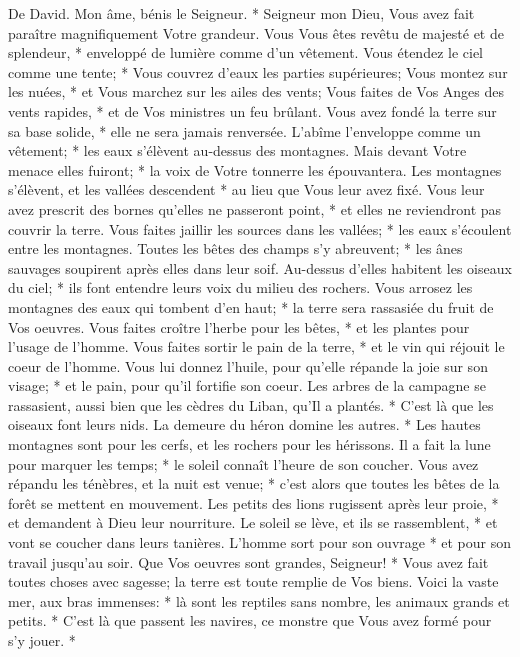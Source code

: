 De David. Mon âme, bénis le Seigneur. * Seigneur mon Dieu, Vous avez fait paraître magnifiquement Votre grandeur. Vous Vous êtes revêtu de majesté et de splendeur, *
enveloppé de lumière comme d'un vêtement. Vous étendez le ciel comme une tente; *
Vous couvrez d'eaux les parties supérieures; Vous montez sur les nuées, * et Vous marchez sur les ailes des vents;
Vous faites de Vos Anges des vents rapides, * et de Vos ministres un feu brûlant.
Vous avez fondé la terre sur sa base solide, * elle ne sera jamais renversée.
L'abîme l'enveloppe comme un vêtement; * les eaux s'élèvent au-dessus des montagnes.
Mais devant Votre menace elles fuiront; * la voix de Votre tonnerre les épouvantera.
Les montagnes s'élèvent, et les vallées descendent * au lieu que Vous leur avez fixé.
Vous leur avez prescrit des bornes qu'elles ne passeront point, * et elles ne reviendront pas couvrir la terre.
Vous faites jaillir les sources dans les vallées; * les eaux s'écoulent entre les montagnes.
Toutes les bêtes des champs s'y abreuvent; * les ânes sauvages soupirent après elles dans leur soif.
Au-dessus d'elles habitent les oiseaux du ciel; * ils font entendre leurs voix du milieu des rochers.
Vous arrosez les montagnes des eaux qui tombent d'en haut; * la terre sera rassasiée du fruit de Vos oeuvres.
Vous faites croître l'herbe pour les bêtes, * et les plantes pour l'usage de l'homme. Vous faites sortir le pain de la terre, *
et le vin qui réjouit le coeur de l'homme. Vous lui donnez l'huile, pour qu'elle répande la joie sur son visage; * et le pain, pour qu'il fortifie son coeur.
Les arbres de la campagne se rassasient, aussi bien que les cèdres du Liban, qu'Il a plantés. *
C'est là que les oiseaux font leurs nids. La demeure du héron domine les autres. *
Les hautes montagnes sont pour les cerfs, et les rochers pour les hérissons.
Il a fait la lune pour marquer les temps; * le soleil connaît l'heure de son coucher.
Vous avez répandu les ténèbres, et la nuit est venue; * c'est alors que toutes les bêtes de la forêt se mettent en mouvement.
Les petits des lions rugissent après leur proie, * et demandent à Dieu leur nourriture.
Le soleil se lève, et ils se rassemblent, * et vont se coucher dans leurs tanières.
L'homme sort pour son ouvrage * et pour son travail jusqu'au soir.
Que Vos oeuvres sont grandes, Seigneur! * Vous avez fait toutes choses avec sagesse; la terre est toute remplie de Vos biens.
Voici la vaste mer, aux bras immenses: * là sont les reptiles sans nombre, les animaux grands et petits. *
C'est là que passent les navires, ce monstre que Vous avez formé pour s'y jouer. *
